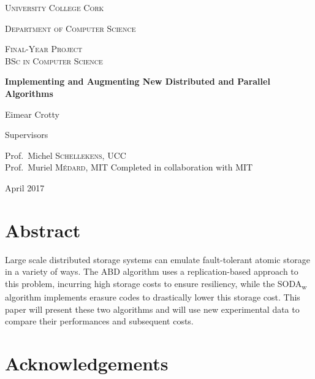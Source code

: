 \documentclass[12pt]{report}
\theoremstyle{definition}
\begin{document}
  \begin{titlepage}
    \centering
    {\scshape\LARGE University College Cork\par}
    \vspace{.2cm}
    {\scshape Department of Computer Science\par}
    \vspace{.7cm}
    {\scshape\Large Final-Year Project\\BSc in Computer Science\par}
    \vspace{1.5cm}
    {\huge\bfseries Implementing and Augmenting New Distributed and Parallel Algorithms\par}
    \vspace{2cm}
    {\Large Eimear Crotty\par}
    \vfill
    Supervisors\par
    Prof.~Michel \textsc{Schellekens}, UCC\\
    Prof.~Muriel \textsc{M\'{e}dard}, MIT
    \vfill
    Completed in collaboration with MIT\\
    \vfill

    \vfill

    {\large April 2017}
  \end{titlepage}

  \chapter*{Abstract}
    Large scale distributed storage systems can emulate fault-tolerant atomic storage in a variety of ways. The ABD algorithm uses a replication-based approach to this problem, incurring high storage costs to ensure resiliency, while the SODA\textsubscript{w} algorithm implements erasure codes to drastically lower this storage cost. This paper will present these two algorithms and will use new experimental data to compare their performances and subsequent costs.

  \chapter*{Acknowledgements}
\end{document}
